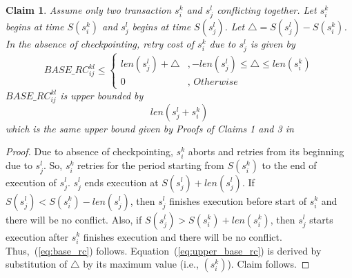 \documentclass[conference]{IEEEtran}
\newtheorem{clm}{Claim}
\begin{document}
\begin{clm}\label{clm:basic_rc}
Assume only two transaction $s_i^k$ and $s_j^l$ conflicting together. Let $s_i^k$ begins at time $S\left(s_i^k\right)$ and $s_j^l$ begins at time $S\left(s_j^l\right)$. Let $\triangle=S\left(s_j^l\right)-S\left(s_i^k\right)$. In the absence of checkpointing, retry cost of $s_i^k$ due to $s_j^l$ is given by
%
\begin{equation}
BASE\_RC_{ij}^{kl} \le \begin{cases}
len\left(s_{j}^{l}\right)+\triangle & ,-len\left(s_{j}^{l}\right)\le\triangle\le len\left(s_{i}^{k}\right)\\
0 & ,\, Otherwise
\end{cases}
\label{eq:base_rc}
\end{equation}
%
$BASE\_RC_{ij}^{kl}$ is upper bounded by 
\begin{equation}
len\left(s_j^l+s_i^k\right)\label{eq:upper_base_rc}
\end{equation}
%
which is the same upper bound given by Proofs of Claims 1 and 3 in~\cite{stmconcurrencycontrol:emsoft11}
\end{clm}
%
\begin{proof}
Due to absence of checkpointing, $s_i^k$ aborts and retries from its beginning due to $s_j^l$. So, $s_i^k$ retries for the period starting from $S\left(s_i^k\right)$ to the end of execution of $s_j^l$. $s_j^l$ ends execution at $S\left(s_j^l\right)+len\left(s_j^l\right)$. If $S\left(s_j^l\right)<S\left(s_i^k\right)-len\left(s_j^l\right)$, then $s_j^l$ finishes execution before start of $s_i^k$ and there will be no conflict. Also, if $S\left(s_j^l\right)>S\left(s_i^k\right)+len\left(s_i^k\right)$, then $s_j^l$ starts execution after $s_i^k$ finishes execution and there will be no conflict. Thus,~(\ref{eq:base_rc}) follows. Equation~(\ref{eq:upper_base_rc}) is derived by substitution of $\triangle$ by its maximum value (i.e., $\left(s_{i}^{k}\right)$). Claim follows.
\end{proof}
%
\end{document}
